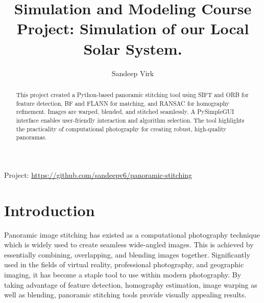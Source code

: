\documentclass[12pt, letterpaper, ]{article}
\title{\textbf{Simulation and Modeling Course Project: Simulation of our Local Solar System.}} %
\author{Sandeep Virk} %
\affiliation{Ontario Tech University} %
\begin{document}
\maketitle



\begin{abstract}
    \noindent
    
    This project created a Python-based panoramic stitching tool using SIFT and ORB for feature detection, BF and FLANN for matching, and RANSAC for homography refinement. Images are warped, blended, and stitched seamlessly. A PySimpleGUI interface enables user-friendly interaction and algorithm selection. The tool highlights the practicality of computational photography for creating robust, high-quality panoramas.

\end{abstract}

Project: \url{https://github.com/sandeepv6/panoramic-stitching}

\vspace{2.5cm}


\thispagestyle{firstpage}

\pagebreak


\newgeometry{} %
\section{Introduction}
\label{sec:intro}

Panoramic image stitching has existed as a computational photography technique which is widely used to create seamless wide-angled images. This is achieved by essentially combining, overlapping, and blending images together. Significantly used in the fields of virtual reality, professional photography, and geographic imaging, it has become a staple tool to use within modern photography. By taking advantage of  feature detection, homography estimation, image warping as well as blending, panoramic stitching tools provide visually appealing results.
\end{document}
